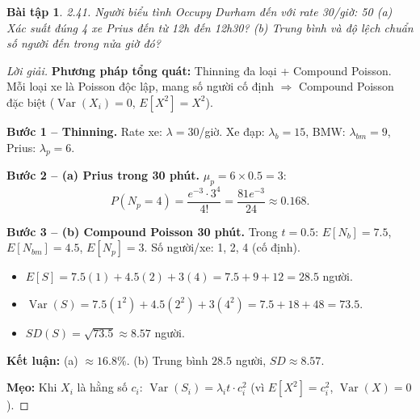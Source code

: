 \documentclass[8pt,a4paper]{article}
\newtheorem{exercise}{Bài tập}
\newenvironment{solution}{\begin{proof}[Lời giải]}{\end{proof}}
\newcommand{\Var}{\operatorname{Var}}
\begin{document}
\begin{exercise}
2.41. Người biểu tình Occupy Durham đến với rate 30/giờ: 50%
(a) Xác suất đúng 4 xe Prius đến từ 12h đến 12h30?
(b) Trung bình và độ lệch chuẩn số người đến trong nửa giờ đó?
\end{exercise}
\begin{solution}
\textbf{Phương pháp tổng quát:} Thinning đa loại + Compound Poisson. Mỗi loại xe là Poisson độc lập, mang số người cố định $\Rightarrow$ Compound Poisson đặc biệt ($\Var(X_i) = 0$, $E[X^2] = X^2$).

\textbf{Bước 1 -- Thinning.} Rate xe: $\lambda = 30$/giờ. Xe đạp: $\lambda_b = 15$, BMW: $\lambda_{bm} = 9$, Prius: $\lambda_p = 6$.

\textbf{Bước 2 -- (a) Prius trong 30 phút.} $\mu_p = 6 \times 0.5 = 3$:
\[
  P(N_p = 4) = \frac{e^{-3} \cdot 3^4}{4!} = \frac{81e^{-3}}{24} \approx \boxed{0.168}.
\]

\textbf{Bước 3 -- (b) Compound Poisson 30 phút.} Trong $t = 0.5$: $E[N_b] = 7.5$, $E[N_{bm}] = 4.5$, $E[N_p] = 3$. Số người/xe: 1, 2, 4 (cố định).
\begin{itemize}[nosep]
  \item $E[S] = 7.5(1) + 4.5(2) + 3(4) = 7.5 + 9 + 12 = \boxed{28.5}$ người.
  \item $\Var(S) = 7.5(1^2) + 4.5(2^2) + 3(4^2) = 7.5 + 18 + 48 = 73.5$.
  \item $SD(S) = \sqrt{73.5} \approx \boxed{8.57}$ người.
\end{itemize}

\textbf{Kết luận:} (a) $\approx 16.8\%$. (b) Trung bình $28.5$ người, $SD \approx 8.57$.

\textbf{Mẹo:} Khi $X_i$ là hằng số $c_i$: $\Var(S_i) = \lambda_i t \cdot c_i^2$ (vì $E[X^2] = c_i^2$, $\Var(X) = 0$).
\end{solution}
\end{document}
